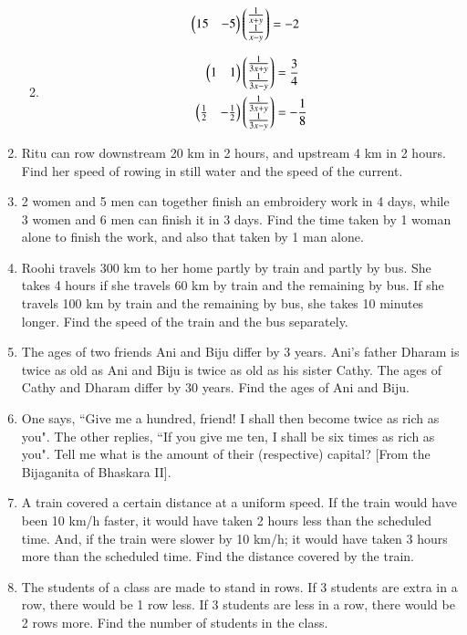 \begin{enumerate}[label=\arabic*.,ref=\thesubsection.\theenumi]
\begin{enumerate}[itemsep=2pt]
\begin{align}
\begin{split}
\begin{pmatrix}15 & -5 \end{pmatrix}\begin{pmatrix}\frac{1}{x+y} \\ \frac{1}{x-y}\end{pmatrix}&=-2
\end{split}
\end{align}
\item 
\begin{align}
\begin{split}
\begin{pmatrix}1 & 1 \end{pmatrix}\begin{pmatrix}\frac{1}{3x+y} \\ \frac{1}{3x-y}\end{pmatrix}&=\frac{3}{4}\\
\begin{pmatrix}\frac{1}{2} & -\frac{1}{2} \end{pmatrix}\begin{pmatrix}\frac{1}{3x+y} \\ \frac{1}{3x-y}\end{pmatrix}&=-\frac{1}{8}
\end{split}
\end{align}
\end{enumerate}
%
\item Ritu can row downstream 20 km in 2 hours, and upstream 4 km in 2 hours. Find her speed of rowing in still water and the speed of the current.
\item  2 women and 5 men can together finish an embroidery work in 4 days, while 3 women and 6 men can finish it in 3 days. Find the time taken by 1 woman alone to finish the work, and also that taken by 1 man alone.
\item  Roohi travels 300 km to her home partly by train and partly by bus. She takes 4 hours if she travels 60 km by train and the remaining by bus. If she travels 100 km by train and the remaining by bus, she takes 10 minutes longer. Find the speed of the train and the bus separately.
\item The ages of two friends Ani and Biju differ by 3 years. Ani’s father Dharam is twice as old as Ani and Biju is twice as old as his sister Cathy. The ages of Cathy and Dharam differ by 30 years. Find the ages of Ani and Biju.
\item One says, ``Give me a hundred, friend! I shall then become twice as rich as you". The other replies, ``If you give me ten, I shall be six times as rich as you". Tell me what is the amount of their (respective) capital? [From the Bijaganita of Bhaskara II]. 
\item A train covered a certain distance at a uniform speed. If the train would have been 10 km/h faster, it would have taken 2 hours less than the scheduled time. And, if the train were slower by 10 km/h; it would have taken 3 hours more than the scheduled time. Find the distance covered by the train.
\item The students of a class are made to stand in rows. If 3 students are extra in a row, there would be 1 row less. If 3 students are less in a row, there would be 2 rows more. Find the number of students in the class.
\end{enumerate}
%
